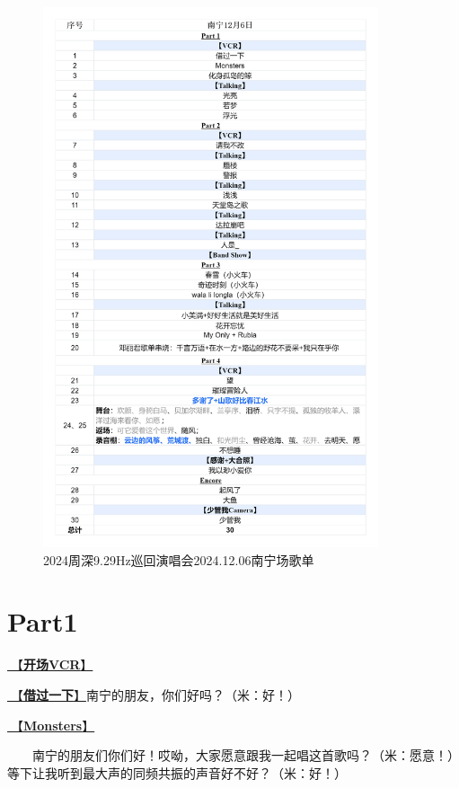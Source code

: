 \documentclass[]{ctexbook}
\begin{document}
\begin{figure}

{\centering \includegraphics[width=280pt]{img/playlists/playlists-nanning-20241206} 

}

\caption{2024周深9.29Hz巡回演唱会2024.12.06南宁场歌单}\label{fig:unnamed-chunk-152}
\end{figure}

\newpage

\section{Part1}\label{nanning-20241206-part1}

\hyperref[opening-vcr]{🎥【\textbf{开场VCR}】}

\hyperref[I-will-go-my-way]{🎵【\textbf{借过一下}】}南宁的朋友，你们好吗？（米：好！）

\hyperref[Monsters]{🎵【\textbf{Monsters}】}

  南宁的朋友们你们好！哎呦，大家愿意跟我一起唱这首歌吗？（米：愿意！）等下让我听到最大声的同频共振的声音好不好？（米：好！）
\end{document}
